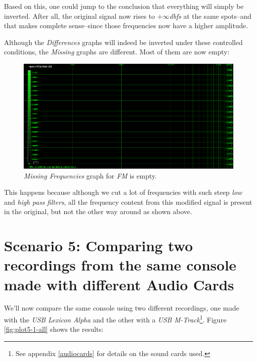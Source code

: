 \documentclass[10pt,a4paper]{report}
\newcommand{\db}[1]{\textit{#1\acrshort{dbfs}}}
\begin{document}
Based on this, one could jump to the conclusion that everything will simply be inverted. After all, the original signal now rises to \db{$+\infty$} at the same spots--and that makes complete sense--since those frequencies now have a higher amplitude. 

Although the \textit{Differences} graphs will indeed be inverted under these controlled conditions, the \textit{Missing} graphs are different. Most of them are now empty:

\begin{figure}[H]
	\centering
	\includegraphics[width=1.0\linewidth]{images/interpretation/Plot4-8-Missing-FM-Inverted.png}
	\caption[Reversed FM Missing]{\textit{Missing Frequencies} graph for \textit{FM} is empty.}
	\label{fig:plot4-8-missing-fm-inverted}
\end{figure}

This happens because although we cut a lot of frequencies with such steep \textit{low} and \textit{high pass filters}, all the frequency content from this modified signal is present in the original, but not the other way around as shown above.

\section{Scenario 5: Comparing two recordings from the same console made with different Audio Cards}

We'll now compare the same console using two different recordings, one made with the \textit{USB Lexicon Alpha} and the other with a \textit{USB M-Track}\footnote{See appendix \ref{audiocards} for details on the sound cards used.}. Figure \ref{fig:plot5-1-all} shows the results:
\end{document}
